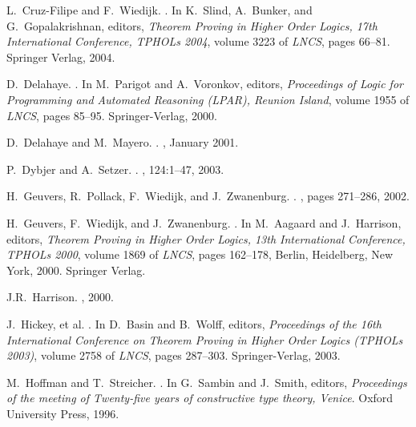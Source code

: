 \documentclass[numreferences]{kluwer}
\begin{document}
\begin{article}
\begin{thebibliography}{99}
L.~Cruz-Filipe and F.~Wiedijk.
.
\newblock In K.~Slind, A.~Bunker, and G.~Gopalakrishnan, editors, {\em Theorem
  Proving in Higher Order Logics, 17th International Conference, TPHOLs 2004},
  volume 3223 of {\em LNCS}, pages 66--81. Springer Verlag, 2004.

D.~Delahaye.
.
\newblock In M.~Parigot and A.~Voronkov, editors, {\em Proceedings of
  Logic for Programming and Automated Reasoning (LPAR), Reunion Island}, volume
  1955 of {\em LNCS}, pages 85--95. Springer-Verlag, 2000.

D.~Delahaye and M.~Mayero.
.
, January
  2001.

P.~Dybjer and A.~Setzer.
.
, 124:1--47, 2003.

H.~Geuvers, R.~Pollack, F.~Wiedijk, and J.~Zwanenburg.
.
, pages
  271--286, 2002.

H.~Geuvers, F.~Wiedijk, and J.~Zwanenburg.
.
\newblock In M.~Aagaard and J.~Harrison, editors, {\em Theorem Proving in
  Higher Order Logics, 13th International Conference, TPHOLs 2000}, volume 1869
  of {\em LNCS}, pages 162--178, Berlin, Heidelberg, New York, 2000. Springer
  Verlag.

J.R.~Harrison.
, 2000.

J.~Hickey, et al.
.
\newblock In D.~Basin and B.~Wolff, editors, {\em Proceedings of the
  16th International Conference on Theorem Proving in Higher Order Logics
  (TPHOLs 2003)}, volume 2758 of {\em LNCS}, pages 287--303. Springer-Verlag,
  2003.

M.~Hoffman and T.~Streicher.
.
\newblock In G.~Sambin and J.~Smith, editors, {\em Proceedings of the
  meeting of Twenty-five years of constructive type theory, Venice}. Oxford
  University Press, 1996.


\end{thebibliography}
\end{article}
\end{document}
